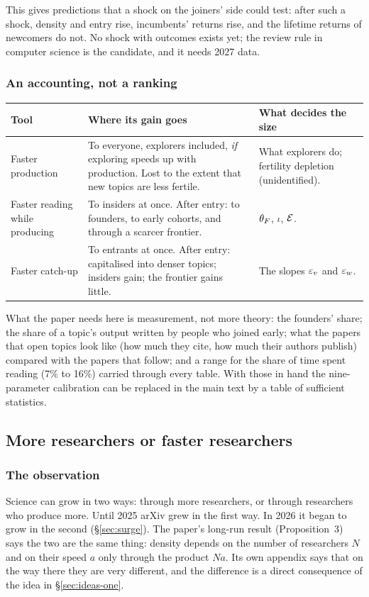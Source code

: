 This gives predictions that a shock on the joiners' side could test: after such a shock, density and entry rise, incumbents' returns rise, and the lifetime returns of newcomers do not. No shock with outcomes exists yet; the review rule in computer science is the candidate, and it needs 2027 data.

\subsubsection{An accounting, not a ranking}
\begin{center}\small
\begin{tabularx}{\textwidth}{@{}P{1.5in}LL@{}}
\toprule
Tool & Where its gain goes & What decides the size \\
\midrule
Faster production & To everyone, explorers included, \emph{if} exploring speeds up with production. Lost to the extent that new topics are less fertile. & What explorers do; fertility depletion (unidentified). \\
Faster reading while producing & To insiders at once. After entry: to founders, to early cohorts, and through a scarcer frontier. & $\theta_F$, $\iota$, $\mathcal{E}$. \\
Faster catch-up & To entrants at once. After entry: capitalised into denser topics; insiders gain; the frontier gains little. & The slopes $\varepsilon_v$ and $\varepsilon_w$. \\
\bottomrule
\end{tabularx}
\end{center}

What the paper needs here is measurement, not more theory: the founders' share; the share of a topic's output written by people who joined early; what the papers that open topics look like (how much they cite, how much their authors publish) compared with the papers that follow; and a range for the share of time spent reading (7\% to 16\%) carried through every table. With those in hand the nine-parameter calibration can be replaced in the main text by a table of sufficient statistics.

\subsection{More researchers or faster researchers}\label{sec:ideas-scale}

\subsubsection{The observation}
Science can grow in two ways: through more researchers, or through researchers who produce more. Until 2025 arXiv grew in the first way. In 2026 it began to grow in the second (\S\ref{sec:surge}). The paper's long-run result (Proposition~3) says the two are the same thing: density depends on the number of researchers $N$ and on their speed $a$ only through the product $Na$. Its own appendix says that on the way there they are very different, and the difference is a direct consequence of the idea in \S\ref{sec:ideas-one}.

